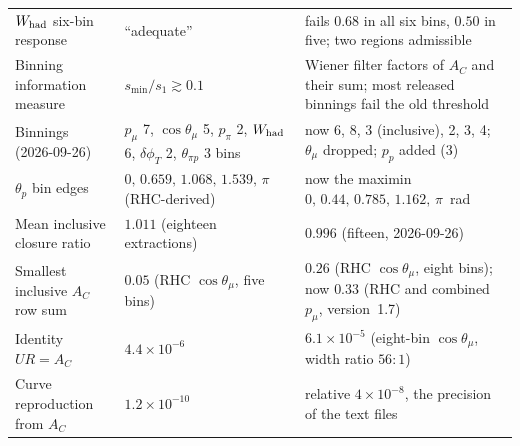 \begin{center}
\begin{tabular}{p{4.3cm}p{4.2cm}p{6.4cm}}
$W_{\rm had}$ six-bin response       & ``adequate''     & fails $0.68$ in all six bins, $0.50$ in five; two regions admissible \\
Binning information measure         & $s_{\min}/s_1\gtrsim0.1$ & Wiener filter factors of $A_C$ and their sum; most released binnings fail the old threshold \\
Binnings (2026-09-26)               & $p_\mu$ 7, $\cos\theta_\mu$ 5, $p_\pi$ 2, $W_{\rm had}$ 6, $\delta\phi_T$ 2, $\theta_{\pi p}$ 3 bins & now 6, 8, 3 (inclusive), 2, 3, 4; $\theta_\mu$ dropped; $p_p$ added (3) \\
$\theta_p$ bin edges                & $0,\,0.659,\,1.068,\,1.539,\,\pi$ (RHC-derived) & now the maximin $0,\,0.44,\,0.785,\,1.162,\,\pi$~rad \\
Mean inclusive closure ratio        & $1.011$ (eighteen extractions) & $0.996$ (fifteen, 2026-09-26) \\
Smallest inclusive $A_C$ row sum    & $0.05$ (RHC $\cos\theta_\mu$, five bins) & $0.26$ (RHC $\cos\theta_\mu$, eight bins); now $0.33$ (RHC and combined $p_\mu$, version~1.7) \\
Identity $UR=A_C$                   & $4.4\times10^{-6}$ & $6.1\times10^{-5}$ (eight-bin $\cos\theta_\mu$, width ratio $56{:}1$) \\
Curve reproduction from $A_C$       & $1.2\times10^{-10}$ & relative $4\times10^{-8}$, the precision of the text files \\
\bottomrule
\end{tabular}
\end{center}



